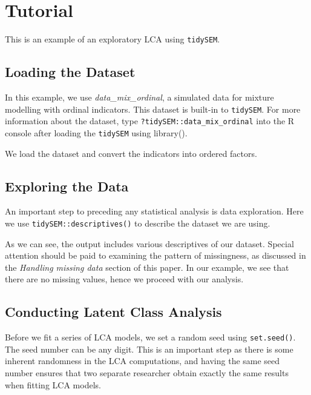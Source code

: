 \documentclass[
  ,man,floatsintext]{apa6}
\begin{document}
\hypertarget{tutorial}{%
\section{Tutorial}\label{tutorial}}

This is an example of an exploratory LCA using \texttt{tidySEM}.

\hypertarget{loading-the-dataset}{%
\subsection{Loading the Dataset}\label{loading-the-dataset}}

In this example, we use \emph{data\_mix\_ordinal}, a simulated data for mixture
modelling with ordinal indicators. This dataset is built-in to
\texttt{tidySEM}. For more information about the dataset, type
\texttt{?tidySEM::data\_mix\_ordinal} into the R console after loading the
\texttt{tidySEM} using library().

We load the dataset and convert the indicators into ordered factors.

\hypertarget{exploring-the-data}{%
\subsection{Exploring the Data}\label{exploring-the-data}}

An important step to preceding any statistical analysis is data
exploration. Here we use \texttt{tidySEM::descriptives()} to describe the
dataset we are using.

As we can see, the output includes various descriptives of our dataset.
Special attention should be paid to examining the pattern of
missingness, as discussed in the \emph{Handling missing data} section of this
paper. In our example, we see that there are no missing values, hence we
proceed with our analysis.

\hypertarget{conducting-latent-class-analysis}{%
\subsection{Conducting Latent Class Analysis}\label{conducting-latent-class-analysis}}

Before we fit a series of LCA models, we set a random seed using
\texttt{set.seed()}. The seed number can be any digit. This is an important
step as there is some inherent randomness in the LCA computations, and
having the same seed number ensures that two separate researcher obtain
exactly the same results when fitting LCA models.
\end{document}
